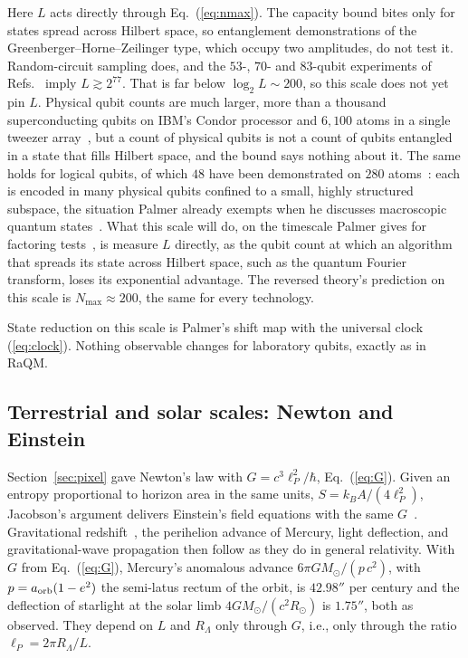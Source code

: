 \documentclass[aps,prd,twocolumn,superscriptaddress,nofootinbib,showkeys]{revtex4-2}
\begin{document}
Here $L$ acts directly through Eq.~(\ref{eq:nmax}). The capacity bound bites only for states spread across Hilbert space, so entanglement demonstrations of the Greenberger--Horne--Zeilinger type, which occupy two amplitudes, do not test it. Random-circuit sampling does, and the $53$-, $70$- and $83$-qubit experiments of Refs.~\cite{arute2019,morvan2024,gao2025} imply $L\gtrsim2^{77}$. That is far below $\log_2L\sim200$, so this scale does not yet pin $L$. Physical qubit counts are much larger, more than a thousand superconducting qubits on IBM's Condor processor and $6{,}100$ atoms in a single tweezer array~\cite{manetsch2025}, but a count of physical qubits is not a count of qubits entangled in a state that fills Hilbert space, and the bound says nothing about it. The same holds for logical qubits, of which $48$ have been demonstrated on $280$ atoms~\cite{bluvstein2024}: each is encoded in many physical qubits confined to a small, highly structured subspace, the situation Palmer already exempts when he discusses macroscopic quantum states~\cite{palmer2026}. What this scale will do, on the timescale Palmer gives for factoring tests~\cite{palmer2026,gidney2025}, is measure $L$ directly, as the qubit count at which an algorithm that spreads its state across Hilbert space, such as the quantum Fourier transform, loses its exponential advantage. The reversed theory's prediction on this scale is $N_{\max}\approx200$, the same for every technology.

State reduction on this scale is Palmer's shift map with the universal clock (\ref{eq:clock}). Nothing observable changes for laboratory qubits, exactly as in RaQM.

\subsection{Terrestrial and solar scales: Newton and Einstein}

Section~\ref{sec:pixel} gave Newton's law with $G = c^3\ell_P^2/\hbar$, Eq.~(\ref{eq:G}). Given an entropy proportional to horizon area in the same units, $S = k_B A/(4\ell_P^2)$, Jacobson's argument delivers Einstein's field equations with the same $G$~\cite{jacobson1995}. Gravitational redshift~\cite{pound1960}, the perihelion advance of Mercury, light deflection, and gravitational-wave propagation then follow as they do in general relativity. With $G$ from Eq.~(\ref{eq:G}), Mercury's anomalous advance $6\pi GM_\odot/(p\,c^2)$, with $p = a_{\rm orb}(1-e^2)$ the semi-latus rectum of the orbit, is $42.98''$ per century and the deflection of starlight at the solar limb $4GM_\odot/(c^2R_\odot)$ is $1.75''$, both as observed. They depend on $L$ and $R_\Lambda$ only through $G$, i.e., only through the ratio $\ell_P = 2\pi R_\Lambda/L$.
\end{document}
